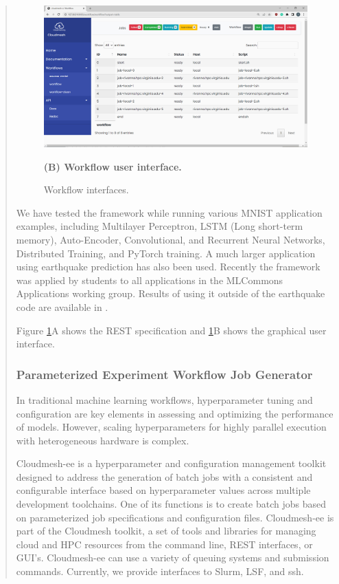 \documentclass[utf8]{FrontiersinVancouver} %
\begin{document}
\begin{quote}
\begin{figure}[htb]
{    \centering\includegraphics[width=0.8\columnwidth]{images/cc-1.jpg}

    {\bf (B) Workflow user interface.}

}
  

    \caption{Workflow interfaces.}
    \label{fig:cc-3}
\end{figure}


We have tested the framework while running various MNIST application examples, including Multilayer Perceptron, LSTM (Long short-term memory), Auto-Encoder, Convolutional, and Recurrent Neural Networks, Distributed Training, and PyTorch training.  A much larger application using earthquake prediction has also been used.
Recently the framework was applied by students to all applications in the MLCommons Applications working group. Results of using it outside of the earthquake code are available in \cite{las-2023-escience}.

Figure \ref{fig:cc-3}A shows the REST specification and \ref{fig:cc-3}B shows the graphical user interface.

\subsubsection{Parameterized Experiment Workflow Job Generator}
\label{sec:workflow-ee}

In traditional machine learning workflows, hyperparameter tuning and configuration are key elements in assessing and optimizing the performance of models. However, scaling hyperparameters for highly parallel execution with heterogeneous hardware is complex.

Cloudmesh-ee \cite{cloudmesh-ee,las-2023-escience} is a hyperparameter and configuration management toolkit designed to address the generation of batch jobs with a consistent and configurable interface based on hyperparameter values across multiple development toolchains. One of its functions is to create batch jobs based on parameterized job specifications and configuration files.  Cloudmesh-ee is part of the Cloudmesh toolkit, a set of tools and libraries for managing cloud and HPC resources from the command line, REST interfaces, or GUI's.  Cloudmesh-ee can use a variety of queuing systems and submission commands. Currently, we provide interfaces to Slurm, LSF, and ssh. 


\end{quote}
\end{document}
